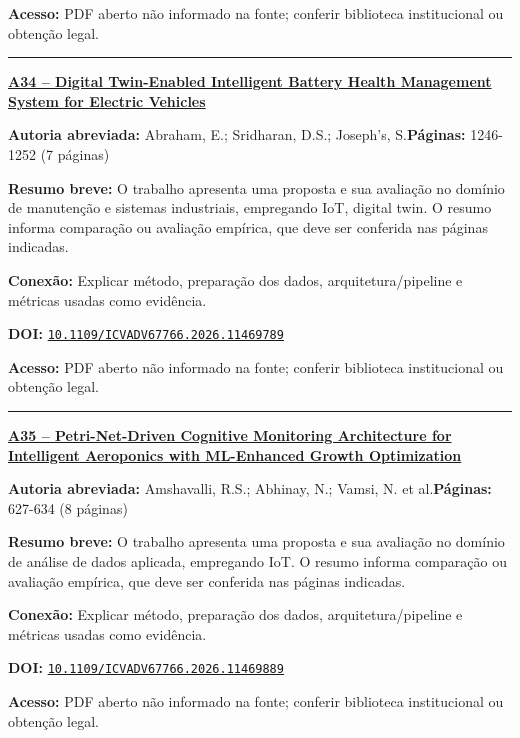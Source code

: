 \documentclass[10pt,a4paper]{article}
\begin{document}
\textbf{Acesso:} PDF aberto não informado na fonte; conferir biblioteca institucional ou obtenção legal.\par
\noindent\rule{\textwidth}{0.35pt}
\par\medskip\noindent
{\large\bfseries\href{https://doi.org/10.1109/ICVADV67766.2026.11469789}{A34 -- Digital Twin-Enabled Intelligent Battery Health Management System for Electric Vehicles}}\par\smallskip
\textbf{Autoria abreviada:} Abraham, E.; Sridharan, D.S.; Joseph's, S.\quad \textbf{Páginas:} 1246-1252 (7 páginas)\par
\textbf{Resumo breve:} O trabalho apresenta uma proposta e sua avaliação no domínio de manutenção e sistemas industriais, empregando IoT, digital twin. O resumo informa comparação ou avaliação empírica, que deve ser conferida nas páginas indicadas.\par
\textbf{Conexão:} Explicar método, preparação dos dados, arquitetura/pipeline e métricas usadas como evidência.\par
\textbf{DOI:} \href{https://doi.org/10.1109/ICVADV67766.2026.11469789}{\nolinkurl{10.1109/ICVADV67766.2026.11469789}}\par
\textbf{Acesso:} PDF aberto não informado na fonte; conferir biblioteca institucional ou obtenção legal.\par
\noindent\rule{\textwidth}{0.35pt}
\par\medskip\noindent
{\large\bfseries\href{https://doi.org/10.1109/ICVADV67766.2026.11469889}{A35 -- Petri-Net-Driven Cognitive Monitoring Architecture for Intelligent Aeroponics with ML-Enhanced Growth Optimization}}\par\smallskip
\textbf{Autoria abreviada:} Amshavalli, R.S.; Abhinay, N.; Vamsi, N. et al.\quad \textbf{Páginas:} 627-634 (8 páginas)\par
\textbf{Resumo breve:} O trabalho apresenta uma proposta e sua avaliação no domínio de análise de dados aplicada, empregando IoT. O resumo informa comparação ou avaliação empírica, que deve ser conferida nas páginas indicadas.\par
\textbf{Conexão:} Explicar método, preparação dos dados, arquitetura/pipeline e métricas usadas como evidência.\par
\textbf{DOI:} \href{https://doi.org/10.1109/ICVADV67766.2026.11469889}{\nolinkurl{10.1109/ICVADV67766.2026.11469889}}\par
\textbf{Acesso:} PDF aberto não informado na fonte; conferir biblioteca institucional ou obtenção legal.\par
\end{document}
